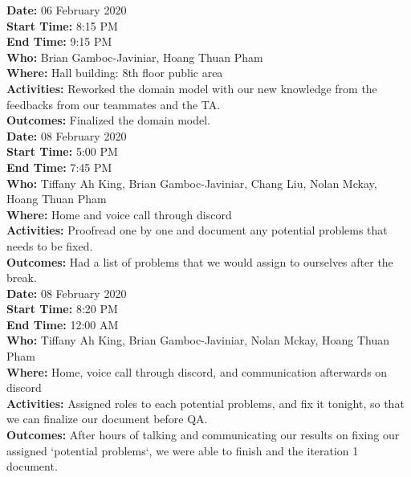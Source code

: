 \documentclass[12pt]{article}
\begin{document}
{\bf Date:} 06 February 2020\\
{\bf Start Time:} 8:15 PM\\
{\bf End Time:} 9:15 PM \\
{\bf Who:} Brian Gamboc-Javiniar, Hoang Thuan Pham\\
{\bf Where:} Hall building: 8th floor public area \\
{\bf Activities:} Reworked the domain model with our new knowledge from the feedbacks from our teammates and the TA.\\
{\bf Outcomes:} Finalized the domain model.\\

{\bf Date:} 08 February 2020\\
{\bf Start Time:} 5:00 PM\\
{\bf End Time:} 7:45 PM \\
{\bf Who:} Tiffany Ah King, Brian Gamboc-Javiniar, Chang Liu, Nolan Mckay, Hoang Thuan Pham\\
{\bf Where:} Home and voice call through discord \\
{\bf Activities:} Proofread one by one and document any potential problems that needs to be fixed.\\
{\bf Outcomes:} Had a list of problems that we would assign to ourselves after the break.\\

{\bf Date:} 08 February 2020\\
{\bf Start Time:} 8:20 PM\\
{\bf End Time:} 12:00 AM \\
{\bf Who:} Tiffany Ah King, Brian Gamboc-Javiniar, Nolan Mckay, Hoang Thuan Pham\\
{\bf Where:} Home, voice call through discord, and communication afterwards on discord \\
{\bf Activities:} Assigned roles to each potential problems, and fix it tonight, so that we can finalize our document before QA.\\
{\bf Outcomes:} After hours of talking and communicating our results on fixing our assigned `potential problems`, we were able to finish and the iteration 1 document.\\



\end{document}
